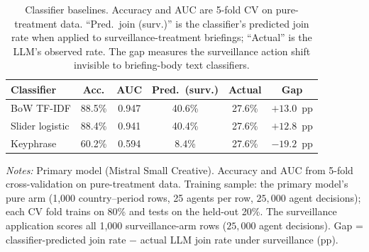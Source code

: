 \begin{table}[t]
\centering
\caption{Classifier baselines. Accuracy and AUC are 5-fold CV on pure-treatment data. ``Pred.\ join (surv.)'' is the classifier's predicted join rate when applied to surveillance-treatment briefings; ``Actual'' is the LLM's observed rate. The gap measures the surveillance action shift invisible to briefing-body text classifiers.}
\label{tab:classifiers}
\scriptsize
\setlength{\tabcolsep}{2pt}
\begin{tabular}{lccccc}
\toprule
Classifier & Acc. & AUC & Pred.\ (surv.) & Actual & Gap \\
\midrule
BoW TF-IDF & 88.5\% & 0.947 & 40.6\% & 27.6\% & $+13.0$~pp \\
Slider logistic & 88.4\% & 0.941 & 40.4\% & 27.6\% & $+12.8$~pp \\
Keyphrase & 60.2\% & 0.594 & 8.4\% & 27.6\% & $-19.2$~pp \\
\bottomrule
\end{tabular}
\begin{tablenotes}
\footnotesize\emph{Notes:} Primary model (Mistral Small Creative). Accuracy and AUC from 5-fold cross-validation on pure-treatment data. Training sample: the primary model's pure arm (1{,}000 country--period rows, 25 agents per row, $25{,}000$ agent decisions); each CV fold trains on 80\% and tests on the held-out 20\%. The surveillance application scores all 1{,}000 surveillance-arm rows ($25{,}000$ agent decisions). Gap = classifier-predicted join rate $-$ actual LLM join rate under surveillance (pp).
\end{tablenotes}
\end{table}
